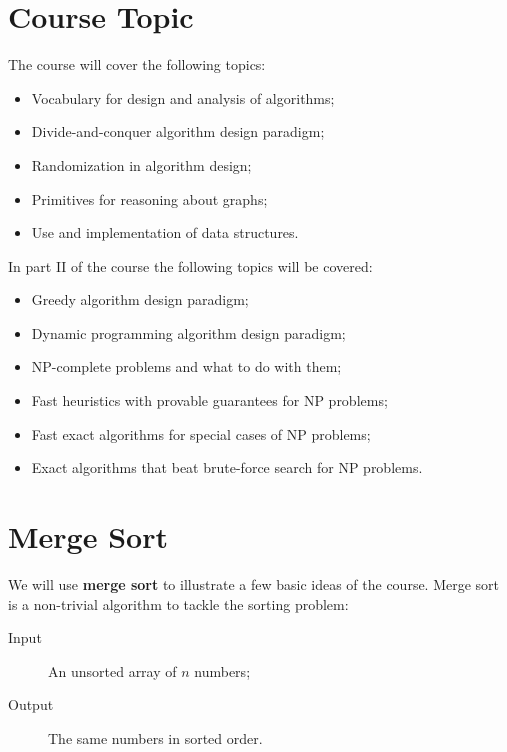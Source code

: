 \section{Course Topic}
The course will cover the following topics:
\begin{itemize}
\item Vocabulary for design and analysis of algorithms;
\item Divide-and-conquer algorithm design paradigm;
\item Randomization in algorithm design;
\item Primitives for reasoning about graphs;
\item Use and implementation of data structures.
\end{itemize}
In part II of the course the following topics will be covered:
\begin{itemize}
\item Greedy algorithm design paradigm;
\item Dynamic programming algorithm design paradigm;
\item NP-complete problems and what to do with them;
\item Fast heuristics with provable guarantees for NP problems;
\item Fast exact algorithms for special cases of NP problems;
\item Exact algorithms that beat brute-force search for NP problems.
\end{itemize}
\section{Merge Sort}
We will use \textbf{merge sort} to illustrate a few basic ideas of the course. Merge sort is a non-trivial algorithm to tackle the sorting problem:
\begin{description}
\item[Input]An unsorted array of $n$ numbers;
\item[Output]The same numbers in sorted order.
\end{description}
